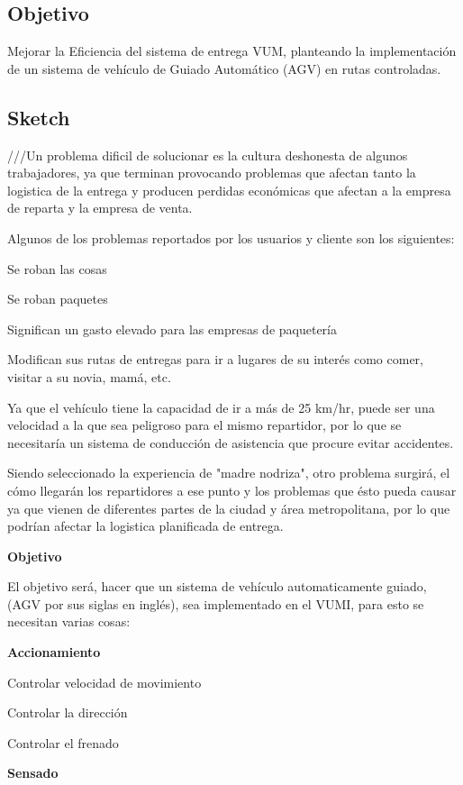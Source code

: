 \subsection{Objetivo}

Mejorar la Eficiencia del sistema de entrega VUM, planteando la implementación de un sistema de vehículo de Guiado Automático (AGV) en rutas controladas.

\subsection{Sketch}

///Un problema dificil de solucionar es la cultura deshonesta de algunos trabajadores, ya que terminan provocando problemas que afectan tanto la logistica de la entrega y producen perdidas económicas que afectan a la empresa de reparta y la empresa de venta.

Algunos de los problemas reportados por los usuarios y cliente son los siguientes:

Se roban las cosas

Se roban paquetes

Significan un gasto elevado para las empresas de paquetería

Modifican sus rutas de entregas para ir a lugares de su interés como comer, visitar a su novia, mamá, etc.

Ya que el vehículo tiene la capacidad de ir a más de 25 km/hr, puede ser una velocidad a la que sea peligroso para el mismo repartidor, por lo que se necesitaría un sistema de conducción de asistencia que procure evitar accidentes.

Siendo seleccionado la experiencia de "madre nodriza", otro problema surgirá, el cómo llegarán los repartidores a ese punto y los problemas que ésto pueda causar ya que vienen de diferentes partes de la ciudad y área metropolitana, por lo que podrían afectar la logistica planificada de entrega.

\textbf{Objetivo}

El objetivo será, hacer que un sistema de vehículo automaticamente guiado, (AGV por sus siglas en inglés), sea implementado en el VUMI, para esto se necesitan varias cosas:

\textbf{Accionamiento}

Controlar velocidad de movimiento

Controlar la dirección

Controlar el frenado

\textbf{Sensado}

